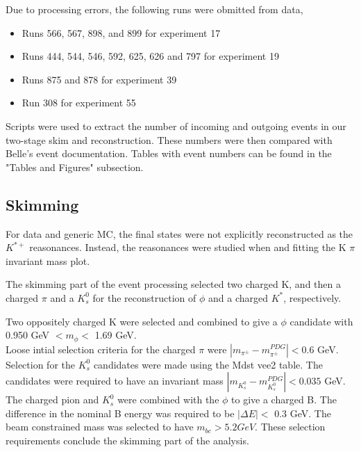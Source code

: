\documentclass[11pt]{article}
\begin{document}
\noindent
Due to processing errors, the following runs were obmitted from data,
\begin{itemize}
\item Runs 566, 567, 898, and 899 for experiment 17
\item Runs 444, 544, 546, 592, 625, 626 and 797 for experiment 19
\item Runs 875 and 878 for experiment 39
\item Run 308 for experiment 55 \\
\end{itemize}
\noindent
Scripts were used to extract the number of incoming and outgoing events
in our two-stage skim and reconstruction. These numbers were then
compared with Belle's event documentation. Tables with event
numbers can be found in the "Tables and Figures" subsection.  

\subsection{Skimming}

For data and generic MC, the final states were not explicitly
reconstructed as the $K^{* +}$ reasonances. Instead, the reasonances were
studied when and fitting the K $\pi$ invariant mass plot. \\ 
\newline

\noindent
The skimming part of the event processing selected two charged K,
and then a charged $\pi$ and a $K^{0}_{s}$ for the reconstruction of
$\phi$ and a charged $K^{*}$, respectively. \\
\newline

\noindent
Two oppositely charged K were selected and combined to give a $\phi$
candidate with 0.950 GeV $ < m_{\phi} <$ 1.69 GeV. \\

\noindent
Loose intial selection criteria for the charged $\pi$ were
$|m_{\pi^{\pm}} - m^{PDG}_{\pi^{\pm}}| < 0.6$ GeV. \\

\noindent
Selection for the $K^{0}_{s}$ candidates were made using the Mdst vee2
table. The candidates were required to have an invariant mass
$|m_{K^{0}_{s}} - m^{PDG}_{K^{0}_{s}}| < 0.035$ GeV. \\

\noindent
The charged pion and $K^{0}_{s}$ were combined with the $\phi$ to give a
charged B. The difference in the nominal B energy was required to be
$|\Delta E| <$ 0.3 GeV. The beam constrained mass was selected to have
$m_{bc} > 5.2 GeV$. These selection requirements conclude the skimming
part of the analysis. \\
\end{document}
